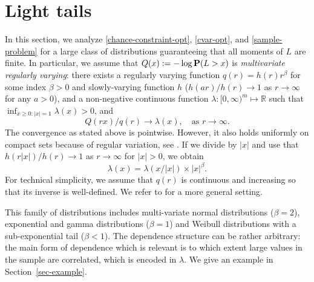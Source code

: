 \documentclass[a4paper, a4wide, 10pt, reqno]{amsart}
\theoremstyle{plain}
\begin{document}
\section{Light tails}
\label{sec-light}
In this section, we analyze \eqref{chance-constraint-opt}, \eqref{cvar-opt}, and \eqref{sample-problem} for a large class of distributions guaranteeing that all moments of $L$ are finite. In particular, we assume that $Q(x):= -\log {\bf P} (L>x)$
is {\em multivariate regularly varying}: there exists a regularly varying function $q(r)=h(r)r^\beta$ for some index $\beta>0$ and slowly-varying function $h$ ($h(ar)/h(r)\rightarrow 1$ as $r\rightarrow\infty$ for any $a>0$), and a non-negative continuous function $\lambda:[0,\infty)^m\mapsto \mathbb{R}$ such that $\inf_{x\geq 0: |x|=1} \lambda (x) >0$, and 
\begin{equation}
\label{assumption-lighttails}
    Q(rx)/q(r) \rightarrow \lambda(x),  \quad \text{as }r\rightarrow\infty.
\end{equation}
The convergence as stated above is pointwise. However, it also holds uniformly on compact sets because of regular variation, see \cite{Resnick07}.
If we divide by $|x|$ and use that $h(r|x|)/h(r) \rightarrow 1$ as $r\rightarrow \infty$ for $|x|>0$, we obtain \begin{equation}\label{eq:lambda-scaling}
     \lambda(x) = \lambda(x/|x|)\times |x|^\beta.
\end{equation}
For technical simplicity, we assume that $q(r)$ is continuous and increasing so that its inverse is well-defined. We refer to \cite{deo2024characterizing} for a more general setting.

This family of distributions includes multi-variate normal distributions ($\beta=2$), exponential and gamma distributions ($\beta=1$) and  Weibull distributions with a sub-exponential tail ($\beta<1$). The dependence structure can be rather arbitrary: the main form of dependence which is relevant is to which extent large values in the sample are correlated, which is encoded in $\lambda$. We give an example in Section~\ref{sec-example}. 
\end{document}
